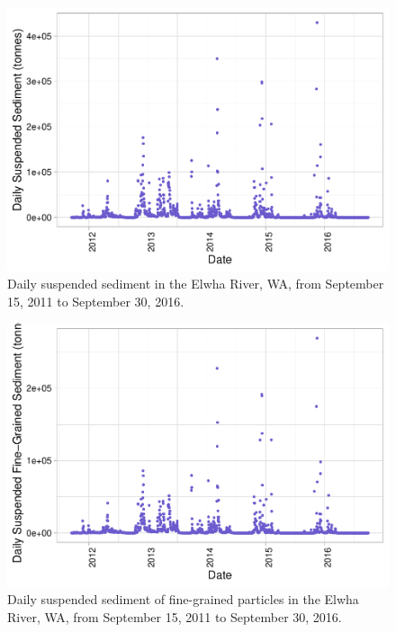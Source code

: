 \documentclass[12pt,]{article}
\begin{document}
\begin{figure}
\centering
\includegraphics{Mason_ENV872_ProjectFinal_files/figure-latex/Exploratory Analysis Figure 2-1.pdf}
\caption{Daily suspended sediment in the Elwha River, WA, from September
15, 2011 to September 30, 2016.}
\end{figure}

\begin{figure}
\centering
\includegraphics{Mason_ENV872_ProjectFinal_files/figure-latex/Exploratory Analysis Figure 3-1.pdf}
\caption{Daily suspended sediment of fine-grained particles in the Elwha
River, WA, from September 15, 2011 to September 30, 2016.}
\end{figure}
\end{document}
